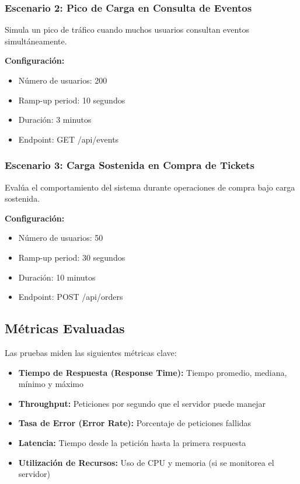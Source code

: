 \documentclass[12pt,a4paper]{article}
\begin{document}
\subsubsection{Escenario 2: Pico de Carga en Consulta de Eventos}

Simula un pico de tráfico cuando muchos usuarios consultan eventos simultáneamente.

\textbf{Configuración:}
\begin{itemize}
    \item Número de usuarios: 200
    \item Ramp-up period: 10 segundos
    \item Duración: 3 minutos
    \item Endpoint: GET /api/events
\end{itemize}

\subsubsection{Escenario 3: Carga Sostenida en Compra de Tickets}

Evalúa el comportamiento del sistema durante operaciones de compra bajo carga sostenida.

\textbf{Configuración:}
\begin{itemize}
    \item Número de usuarios: 50
    \item Ramp-up period: 30 segundos
    \item Duración: 10 minutos
    \item Endpoint: POST /api/orders
\end{itemize}

\subsection{Métricas Evaluadas}

Las pruebas miden las siguientes métricas clave:

\begin{itemize}
    \item \textbf{Tiempo de Respuesta (Response Time):} Tiempo promedio, mediana, mínimo y máximo
    \item \textbf{Throughput:} Peticiones por segundo que el servidor puede manejar
    \item \textbf{Tasa de Error (Error Rate):} Porcentaje de peticiones fallidas
    \item \textbf{Latencia:} Tiempo desde la petición hasta la primera respuesta
    \item \textbf{Utilización de Recursos:} Uso de CPU y memoria (si se monitorea el servidor)
\end{itemize}
\end{document}
